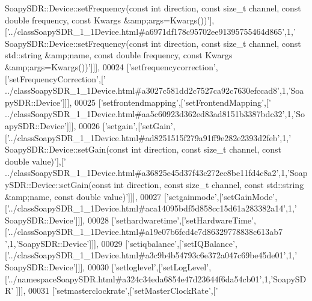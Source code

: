 \begin{DoxyCode}
{      SoapySDR::Device::setFrequency(const int direction, const size\_t channel, const double frequency, const
       Kwargs &amp;args=Kwargs())'}],[\textcolor{stringliteral}{'../classSoapySDR\_1\_1Device.html#a6971df178c95702ee91395755464d865'},1,\textcolor{stringliteral}{'
      SoapySDR::Device::setFrequency(const int direction, const size\_t channel, const std::string &amp;name, const double
       frequency, const Kwargs &amp;args=Kwargs())'}]]],
00024   [\textcolor{stringliteral}{'setfrequencycorrection'},[\textcolor{stringliteral}{'setFrequencyCorrection'},[\textcolor{stringliteral}{'
      ../classSoapySDR\_1\_1Device.html#a3027c581dd2c7527ca92c7630efccad8'},1,\textcolor{stringliteral}{'SoapySDR::Device'}]]],
00025   [\textcolor{stringliteral}{'setfrontendmapping'},[\textcolor{stringliteral}{'setFrontendMapping'},[\textcolor{stringliteral}{'
      ../classSoapySDR\_1\_1Device.html#aa5c60923d362ed83ad8151b3387bdc32'},1,\textcolor{stringliteral}{'SoapySDR::Device'}]]],
00026   [\textcolor{stringliteral}{'setgain'},[\textcolor{stringliteral}{'setGain'},[\textcolor{stringliteral}{'../classSoapySDR\_1\_1Device.html#ad8251515f279a91ff9e282e2393d2feb'},1,\textcolor{stringliteral}{'
      SoapySDR::Device::setGain(const int direction, const size\_t channel, const double value)'}],[\textcolor{stringliteral}{'
      ../classSoapySDR\_1\_1Device.html#a36825e45d37f43c272ec8be11fd4c8a2'},1,\textcolor{stringliteral}{'SoapySDR::Device::setGain(const int direction, const size\_t
       channel, const std::string &amp;name, const double value)'}]]],
00027   [\textcolor{stringliteral}{'setgainmode'},[\textcolor{stringliteral}{'setGainMode'},[\textcolor{stringliteral}{'../classSoapySDR\_1\_1Device.html#aca14095bdf5d858cc15d61a283382a14'},1,\textcolor{stringliteral}{'
      SoapySDR::Device'}]]],
00028   [\textcolor{stringliteral}{'sethardwaretime'},[\textcolor{stringliteral}{'setHardwareTime'},[\textcolor{stringliteral}{'../classSoapySDR\_1\_1Device.html#a19e07b6fcd4c7d86329778838c613ab7
      '},1,\textcolor{stringliteral}{'SoapySDR::Device'}]]],
00029   [\textcolor{stringliteral}{'setiqbalance'},[\textcolor{stringliteral}{'setIQBalance'},[\textcolor{stringliteral}{'../classSoapySDR\_1\_1Device.html#a3c9b4b54793c6e372a047c69be45de01'},1,\textcolor{stringliteral}{'
      SoapySDR::Device'}]]],
00030   [\textcolor{stringliteral}{'setloglevel'},[\textcolor{stringliteral}{'setLogLevel'},[\textcolor{stringliteral}{'../namespaceSoapySDR.html#a324c34eda6854e47d23644f6da54cb01'},1,\textcolor{stringliteral}{'SoapySDR'}
      ]]],
00031   [\textcolor{stringliteral}{'setmasterclockrate'},[\textcolor{stringliteral}{'setMasterClockRate'},[\textcolor{stringliteral}{'
}
\end{DoxyCode}

